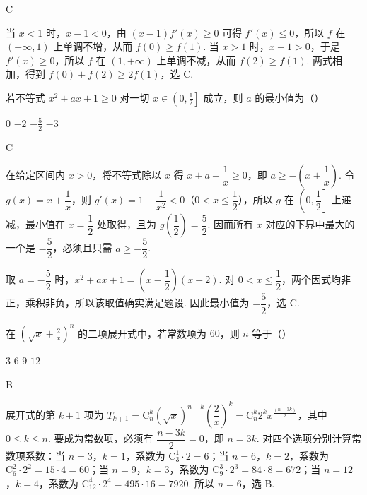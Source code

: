 \begin{answer}
C
\end{answer}

\begin{solution}
当 \(x<1\) 时，\(x-1<0\)，由 \((x-1)f'(x)\geqslant0\) 可得 \(f'(x)\leqslant0\)，所以 \(f\) 在 \((-\infty,1)\) 上单调不增，从而 \(f(0)\geqslant f(1)\). 当 \(x>1\) 时，\(x-1>0\)，于是 \(f'(x)\geqslant0\)，所以 \(f\) 在 \((1,+\infty)\) 上单调不减，从而 \(f(2)\geqslant f(1)\). 两式相加，得到 \(f(0)+f(2)\geqslant2f(1)\)，选 C.
\end{solution}

\begin{problem}
若不等式 \(x^{2} + ax + 1 \geqslant 0\) 对一切 \(x \in \left(0, \frac{1}{2}\right]\) 成立，则 \(a\) 的最小值为（\quad）

\choices
    {\(0\)}
    {\(-2\)}
    {\(-\frac{5}{2}\)}
    {\(-3\)}
\end{problem}

\begin{answer}
C
\end{answer}

\begin{solution}
在给定区间内 \(x>0\)，将不等式除以 \(x\) 得 \(x+a+\dfrac1x\geqslant0\)，即 \(a\geqslant-\left(x+\dfrac1x\right)\). 令 \(g(x)=x+\dfrac1x\)，则 \(g'(x)=1-\dfrac1{x^2}<0\)（\(0<x\leqslant\dfrac12\)），所以 \(g\) 在 \(\left(0,\dfrac12\right]\) 上递减，最小值在 \(x=\dfrac12\) 处取得，且为 \(g\left(\dfrac12\right)=\dfrac52\). 因而所有 \(x\) 对应的下界中最大的一个是 \(-\dfrac52\)，必须且只需 \(a\geqslant-\dfrac52\).

取 \(a=-\dfrac52\) 时，\(x^2+ax+1=\left(x-\dfrac12\right)(x-2)\). 对 \(0<x\leqslant\dfrac12\)，两个因式均非正，乘积非负，所以该取值确实满足题设. 因此最小值为 \(-\dfrac52\)，选 C.
\end{solution}

\begin{problem}
在 \(\left(\sqrt{x} + \frac{2}{x}\right)^n\) 的二项展开式中，若常数项为 \(60\)，则 \(n\) 等于（\quad）

\choices
    {\(3\)}
    {\(6\)}
    {\(9\)}
    {\(12\)}
\end{problem}

\begin{answer}
B
\end{answer}

\begin{solution}
展开式的第 \(k+1\) 项为 \(T_{k+1}=\mathrm C_n^k(\sqrt{x})^{n-k}\left(\dfrac2x\right)^k=\mathrm C_n^k2^k x^{\frac{(n-3k)}{2}}\)，其中 \(0\leqslant k\leqslant n\). 要成为常数项，必须有 \(\dfrac{n-3k}{2}=0\)，即 \(n=3k\). 对四个选项分别计算常数项系数：当 \(n=3\)，\(k=1\)，系数为 \(\mathrm C_3^1\cdot2=6\)；当 \(n=6\)，\(k=2\)，系数为 \(\mathrm C_6^2\cdot2^2=15\cdot4=60\)；当 \(n=9\)，\(k=3\)，系数为 \(\mathrm C_9^3\cdot2^3=84\cdot8=672\)；当 \(n=12\)，\(k=4\)，系数为 \(\mathrm C_{12}^4\cdot2^4=495\cdot16=7920\). 所以 \(n=6\)，选 B.
\end{solution}

